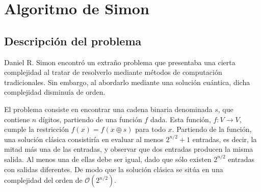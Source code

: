 \documentclass{article}
\theoremstyle{definition}
\begin{document}
\newpage

\section{Algoritmo de Simon}
\subsection{Descripción del problema}

Daniel R. Simon encontró un extraño problema que presentaba una cierta 
complejidad al tratar de resolverlo mediante métodos de computación 
tradicionales. Sin embargo, al abordarlo mediante una solución cuántica, dicha 
complejidad disminuía de orden.

El problema consiste en encontrar una cadena binaria denominada $s$, que 
contiene $n$ dígitos, partiendo de una función $f$ dada. Esta función, $f:V 
\rightarrow V$, cumple la restricción $f(x) = f(x \oplus s)$ para todo $x$.  
Partiendo de la función, una solución clásica consistiría en evaluar al menos 
$2^{n/2} + 1$ entradas, es decir, la mitad más una de las entradas, y observar 
que dos entradas producen la misma salida. Al menos una de ellas debe ser igual, 
dado que sólo existen $2^{n/2}$ entradas con salidas diferentes. De modo que la 
solución clásica se sitúa en una complejidad del orden de 
$\mathcal{O}(2^{n/2})$.
\end{document}
